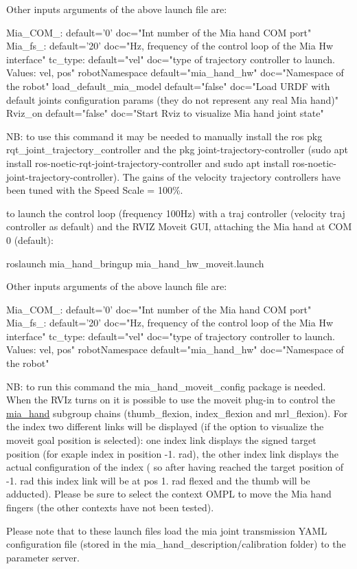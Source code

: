 \begin{DoxyItemize}
Other inputs arguments of the above launch file are\+: \begin{DoxyVerb}Mia_COM_:               default='0'            doc="Int number of the Mia hand COM port"
Mia_fs_:                default='20'           doc="Hz, frequency of the control loop of the Mia Hw interface"
tc_type:                default="vel"          doc="type of trajectory controller to launch. Values: vel, pos"
robotNamespace          default="mia_hand_hw"  doc="Namespace of the robot"
load_default_mia_model  default="false"        doc="Load URDF with default joints configuration params (they do not represent any real Mia hand)"
Rviz_on                 default="false"        doc="Start Rviz to visualize Mia hand joint state"
\end{DoxyVerb}


NB\+: to use this command it may be needed to manually install the ros pkg rqt\+\_\+joint\+\_\+trajectory\+\_\+controller and the pkg joint-\/trajectory-\/controller (sudo apt install ros-\/noetic-\/rqt-\/joint-\/trajectory-\/controller and sudo apt install ros-\/noetic-\/joint-\/trajectory-\/controller). The gains of the velocity trajectory controllers have been tuned with the Speed Scale = 100\%.
\item to launch the control loop (frequency 100Hz) with a traj controller (velocity traj controller as default) and the R\+V\+IZ Moveit G\+UI, attaching the Mia hand at C\+OM 0 (default)\+: \begin{DoxyVerb}roslaunch mia_hand_bringup mia_hand_hw_moveit.launch
\end{DoxyVerb}


Other inputs arguments of the above launch file are\+: \begin{DoxyVerb}Mia_COM_:               default='0'            doc="Int number of the Mia hand COM port"
Mia_fs_:                default='20'          doc="Hz, frequency of the control loop of the Mia Hw interface"
tc_type:                default="vel"          doc="type of trajectory controller to launch. Values: vel, pos"
robotNamespace          default="mia_hand_hw"  doc="Namespace of the robot"
\end{DoxyVerb}


NB\+: to run this command the mia\+\_\+hand\+\_\+moveit\+\_\+config package is needed. When the R\+V\+Iz turns on it is possible to use the moveit plug-\/in to control the \mbox{\hyperlink{namespacemia__hand}{mia\+\_\+hand}} subgroup chains (thumb\+\_\+flexion, index\+\_\+flexion and mrl\+\_\+flexion). For the index two different links will be displayed (if the option to visualize the moveit goal position is selected)\+: one index link displays the signed target position (for exaple index in position -\/1. rad), the other index link displays the actual configuration of the index ( so after having reached the target position of -\/1. rad this index link will be at pos 1. rad flexed and the thumb will be adducted). Please be sure to select the context O\+M\+PL to move the Mia hand fingers (the other contexts have not been tested).
\end{DoxyItemize}

Please note that to these launch files load the mia joint transmission Y\+A\+ML configuration file (stored in the mia\+\_\+hand\+\_\+description/calibration folder) to the parameter server. 